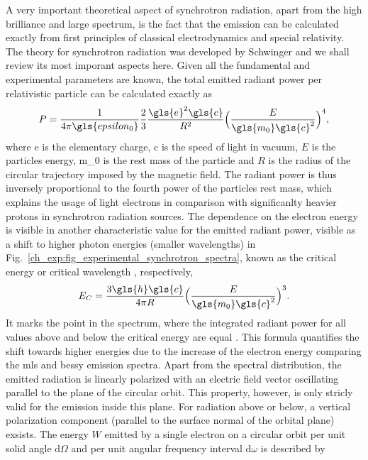 A very important theoretical aspect of synchrotron radiation, apart from the high brilliance and large spectrum, is the fact that the emission can be calculated exactly from first principles of classical electrodynamics and special relativity. The theory for synchrotron radiation was developed by Schwinger \cite{schwinger_classical_1949} and we shall review its most imporant aspects here. Given all the fundamental and experimental parameters are known, the total emitted radiant power per relativistic particle can be calculated exactly as
\begin{align}
 P = \frac{1}{4 \pi \gls{epsilon_0}} \frac{2}{3} \frac{\gls{e}^2 \gls{c}}{R^2}\Big( \frac{E}{\gls{m_0} \gls{c}^2}\Big)^4 \text{,} \label{ch_exp:schwinger_equation_total_power}
\end{align}
where \gls{e} is the elementary charge, \gls{c} is the speed of light in vacuum, $E$ is the particles energy, \gls{m_0} is the rest mass of the particle and $R$ is the radius of the circular trajectory imposed by the magnetic field. The radiant power is thus inversely proportional to the fourth power of the particles rest mass, which explains the usage of light electrons in comparison with significanlty heavier protons in synchrotron radiation sources. The dependence on the electron energy is visible in another characteristic value for the emitted radiant power, visible as a shift to higher photon energies (smaller wavelengths) in Fig.~\ref{ch_exp:fig_experimental_synchrotron_spectra}, known as the critical energy or critical wavelength \cite{schwinger_classical_1949}, respectively,
\begin{align}
 E_C = \frac{3 \gls{h} \gls{c}}{4 \pi R} \Big( \frac{E}{\gls{m_0} \gls{c}^2}\Big)^3 \text{.} \label{ch_exp:characteristic_energy}
\end{align}
It marks the point in the spectrum, where the integrated radiant power for all values above and below the critical energy are equal \cite{balerna_introduction_2015}. This formula quantifies the shift towards higher energies due to the increase of the electron energy comparing the \gls{mls} and \gls{bessy} emission spectra. Apart from the spectral distribution, the emitted radiation is linearly polarized with an electric field vector oscillating parallel to the plane of the circular orbit. This property, however, is only stricly valid for the emission inside this plane. For radiation above or below, a vertical polarization component (parallel to the surface normal of the orbital plane) exsists. The energy $W$ emitted by a single electron on a circular orbit per unit solid angle $\text{d} \Omega$ and per unit angular frequency interval $\text{d} \omega$ is described by
